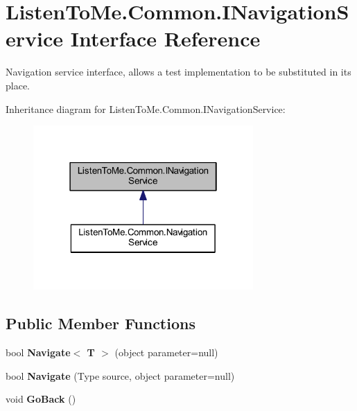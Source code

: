 \hypertarget{interface_listen_to_me_1_1_common_1_1_i_navigation_service}{}\section{Listen\+To\+Me.\+Common.\+I\+Navigation\+Service Interface Reference}
\label{interface_listen_to_me_1_1_common_1_1_i_navigation_service}


Navigation service interface, allows a test implementation to be substituted in its place.  




Inheritance diagram for Listen\+To\+Me.\+Common.\+I\+Navigation\+Service\+:\nopagebreak
\begin{figure}[H]
\begin{center}
\leavevmode
\includegraphics[width=238pt]{interface_listen_to_me_1_1_common_1_1_i_navigation_service__inherit__graph}
\end{center}
\end{figure}
\subsection*{Public Member Functions}
\begin{DoxyCompactItemize}
\item 
bool {\bfseries Navigate$<$ T $>$} (object parameter=null)\hypertarget{interface_listen_to_me_1_1_common_1_1_i_navigation_service_a40fb184a439d179ed60f35e0593d562f}{}\label{interface_listen_to_me_1_1_common_1_1_i_navigation_service_a40fb184a439d179ed60f35e0593d562f}

\item 
bool {\bfseries Navigate} (Type source, object parameter=null)\hypertarget{interface_listen_to_me_1_1_common_1_1_i_navigation_service_a5f7f6b48909f01bad786d018f15728eb}{}\label{interface_listen_to_me_1_1_common_1_1_i_navigation_service_a5f7f6b48909f01bad786d018f15728eb}

\item 
void {\bfseries Go\+Back} ()\hypertarget{interface_listen_to_me_1_1_common_1_1_i_navigation_service_ae965e607ea51a6bbe51cf751b2a52dab}{}\label{interface_listen_to_me_1_1_common_1_1_i_navigation_service_ae965e607ea51a6bbe51cf751b2a52dab}

\end{DoxyCompactItemize}


